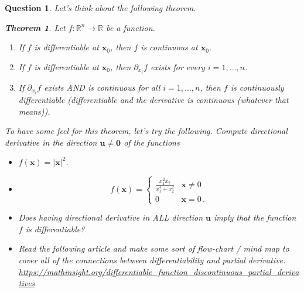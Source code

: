 \documentclass{amsart}
\newtheorem{question}{Question}
\theoremstyle{definition}
\newtheorem{theorem}{Theorem}
\newcommand{\R}{\mathbb{R}}
\newcommand{\vect}{\mathbf}
\begin{document}
\begin{question}
    Let's think about the following theorem.
    \begin{theorem}
        Let $f:\R^n \to \R$ be a function.
        \begin{enumerate}
            \item If $f$ is differentiable at $\vect{x}_0$, then $f$ is continuous at $\vect{x}_0$.
            \item If $f$ is differentiable at $\vect{x}_0$, then $\partial_{x_i} f$ exists for every $i = 1, \dots, n$.
            \item If $\partial_{x_i} f$ exists AND is continuous for all $i = 1,\dots, n$,
                then $f$ is continuously differentiable (differentiable and the derivative
                is continuous (whatever that means)).
        \end{enumerate}
    \end{theorem}
    To have some feel for this theorem, let's try the following.
Compute directional derivative in the direction $\vect{u} \not= \vect{0}$ of the functions
\begin{itemize}
    \item $f(\vect{x}) = |\vect{x}|^2$.
    \item $$ f(\vect{x}) = 
        \begin{cases}
            \frac{x_1^2 x_2}{x_1^4 + x_2^2} & \vect{x} \not= 0 \\
            0 & \vect{x} = 0 \,.
        \end{cases}$$
    \item Does having directional derivative in ALL direction $\vect{u}$ imply 
        that the function $f$ is differentiable?
    \item Read the following article and make some sort of flow-chart / mind map 
        to cover all of the connections between differentiability and
        partial derivative. 
        \url{https://mathinsight.org/differentiable_function_discontinuous_partial_derivatives}
\end{itemize}
\end{question}
\end{document}
